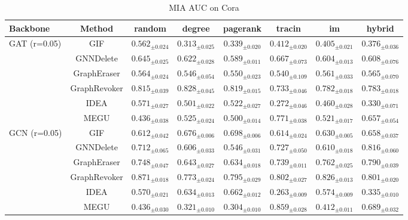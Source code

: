 \begin{table}[t]
\centering\small
\setlength{\tabcolsep}{4pt}
\caption{MIA AUC on Cora}
\label{tab:phaseB-mia_auc-cora}
\begin{tabular}{lccccccc}
\toprule
Backbone & Method & random & degree & pagerank & tracin & im & hybrid \\
\midrule
\multirow{6}{*}{GAT (r=0.05)} & GIF & $0.562_{\pm 0.024}$ & $0.313_{\pm 0.025}$ & $0.339_{\pm 0.020}$ & $0.412_{\pm 0.020}$ & $0.405_{\pm 0.021}$ & $0.376_{\pm 0.036}$ \\
 & GNNDelete & $0.645_{\pm 0.025}$ & $0.622_{\pm 0.028}$ & $0.589_{\pm 0.011}$ & $0.667_{\pm 0.073}$ & $0.604_{\pm 0.013}$ & $0.608_{\pm 0.076}$ \\
 & GraphEraser & $0.564_{\pm 0.024}$ & $0.546_{\pm 0.054}$ & $0.550_{\pm 0.023}$ & $0.540_{\pm 0.109}$ & $0.561_{\pm 0.033}$ & $0.565_{\pm 0.070}$ \\
 & GraphRevoker & $0.815_{\pm 0.039}$ & $0.828_{\pm 0.045}$ & $0.819_{\pm 0.015}$ & $0.733_{\pm 0.046}$ & $0.782_{\pm 0.018}$ & $0.783_{\pm 0.018}$ \\
 & IDEA & $0.571_{\pm 0.027}$ & $0.501_{\pm 0.022}$ & $0.522_{\pm 0.027}$ & $0.272_{\pm 0.046}$ & $0.460_{\pm 0.028}$ & $0.330_{\pm 0.071}$ \\
 & MEGU & $0.436_{\pm 0.038}$ & $0.525_{\pm 0.024}$ & $0.500_{\pm 0.014}$ & $0.771_{\pm 0.038}$ & $0.521_{\pm 0.017}$ & $0.657_{\pm 0.054}$ \\
\midrule
\multirow{6}{*}{GCN (r=0.05)} & GIF & $0.612_{\pm 0.042}$ & $0.676_{\pm 0.006}$ & $0.698_{\pm 0.006}$ & $0.614_{\pm 0.024}$ & $0.630_{\pm 0.005}$ & $0.658_{\pm 0.037}$ \\
 & GNNDelete & $0.712_{\pm 0.065}$ & $0.606_{\pm 0.033}$ & $0.546_{\pm 0.031}$ & $0.727_{\pm 0.050}$ & $0.610_{\pm 0.018}$ & $0.816_{\pm 0.060}$ \\
 & GraphEraser & $0.748_{\pm 0.047}$ & $0.643_{\pm 0.027}$ & $0.634_{\pm 0.018}$ & $0.739_{\pm 0.011}$ & $0.762_{\pm 0.025}$ & $0.790_{\pm 0.039}$ \\
 & GraphRevoker & $0.871_{\pm 0.018}$ & $0.773_{\pm 0.024}$ & $0.795_{\pm 0.029}$ & $0.802_{\pm 0.027}$ & $0.826_{\pm 0.013}$ & $0.801_{\pm 0.020}$ \\
 & IDEA & $0.570_{\pm 0.021}$ & $0.634_{\pm 0.013}$ & $0.662_{\pm 0.012}$ & $0.263_{\pm 0.009}$ & $0.574_{\pm 0.009}$ & $0.335_{\pm 0.010}$ \\
 & MEGU & $0.436_{\pm 0.030}$ & $0.321_{\pm 0.010}$ & $0.304_{\pm 0.010}$ & $0.859_{\pm 0.028}$ & $0.412_{\pm 0.011}$ & $0.689_{\pm 0.032}$ \\
\bottomrule
\end{tabular}
\end{table}

